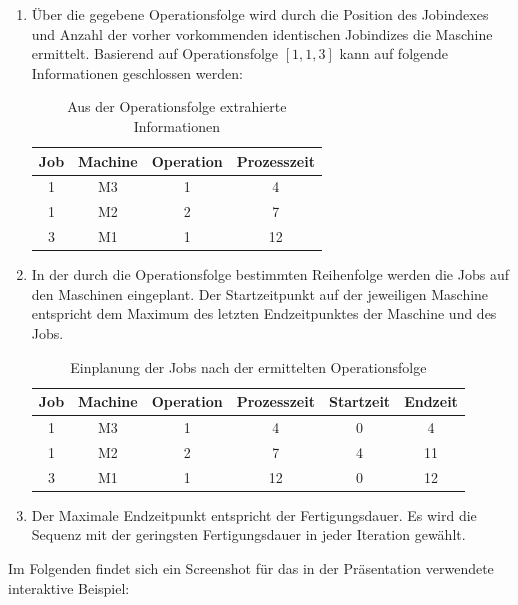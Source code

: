 \documentclass[final, english, ngerman, a4paper, 12pt, %
numbers=noenddot,
cd=true,
cdfont=false,cdfont=nohead,cdfont=nodin,
cdmath=false,
cdhead=false,
cdfoot=true,
cdcover=monochrome,
cdgeometry=symmetric,
declaration=heading,
declaration=notoc,
abstract=heading,
]{tudscrreprt}
\begin{document}
\begin{enumerate}
	\item Über die gegebene Operationsfolge wird durch die Position des Jobindexes und Anzahl der vorher vorkommenden identischen Jobindizes die Maschine ermittelt. Basierend auf Operationsfolge $[1,1,3]$ kann auf folgende Informationen geschlossen werden:
	
	\begin{table}[H]
		\centering
		\begin{tabular}{c c c c }
			\toprule
			Job & Machine & Operation & Prozesszeit \\
			\midrule
			 1   & M3      & 1         & 4           \\
			 1   & M2      & 2         & 7           \\
			3   & M1      & 1         & 12          \\
			\bottomrule
		\end{tabular}
		\caption{Aus der Operationsfolge extrahierte Informationen}
		\label{tab:greedyh11}
	\end{table}

	\item In der durch die Operationsfolge bestimmten Reihenfolge werden die Jobs auf den Maschinen eingeplant. Der Startzeitpunkt auf der jeweiligen Maschine entspricht dem Maximum des letzten Endzeitpunktes der Maschine und des Jobs.
	
	\begin{table}[H]
		\centering
		\begin{tabular}{c c c c c c }
			\toprule
			Job & Machine & Operation & Prozesszeit & Startzeit & Endzeit \\
			\midrule
			1   & M3      & 1         & 4           & 0         & 4       \\
			1   & M2      & 2         & 7           & 4         & 11      \\
			3   & M1      & 1         & 12          & 0         & 12      \\
			\bottomrule
		\end{tabular}
		\caption{Einplanung der Jobs nach der ermittelten Operationsfolge}
		\label{tab:greedyh12}
	\end{table}
	\item Der Maximale Endzeitpunkt entspricht der Fertigungsdauer. Es wird die Sequenz mit der geringsten Fertigungsdauer in jeder Iteration gewählt.
\end{enumerate}
\noindent
Im Folgenden findet sich ein Screenshot für das in der Präsentation verwendete interaktive Beispiel:
\end{document}
